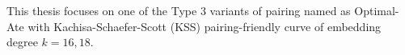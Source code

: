 This thesis focuses on one of the Type 3 variants of pairing named as Optimal-Ate \cite{DBLP:journals/tit/Vercauteren10} with Kachisa-Schaefer-Scott (KSS) \cite{EPRINT:KacSchSco07} pairing-friendly curve of embedding degree $k=16, 18$. 
%
